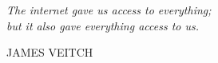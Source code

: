 \clearpage

\thispagestyle{empty}
\null\vfill

\settowidth{}
\begin{center}
\parbox{\longest}{%
  \raggedright{\Large\itshape%
   The internet gave us access to everything; \\ 
  but it also gave everything access to us.\par\bigskip
  }   
  \raggedleft\MakeUppercase{James Veitch}\par%
}
\end{center}


\vfill\vfill

\clearpage